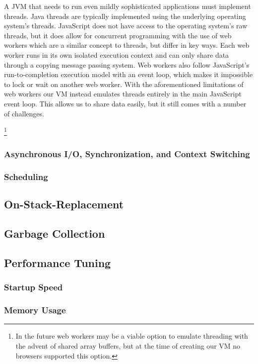 \documentclass{acm_proc_article-sp}
\begin{document}
A JVM that needs to run even mildly sophisticated applications must implement threads.
Java threads are typically implemented using the underlying operating system's threads.
JavaScript does not have access to the operating system's raw threads, but it does allow for concurrent programming with the use of web workers which are a similar concept to threads, but differ in key ways.
Each web worker runs in its own isolated execution context and can only share data through a copying message passing system.
Web workers also follow JavaScript's run-to-completion execution model with an event loop, which makes it impossible to lock or wait on another web worker.
With the aforementioned limitations of web workers our VM instead emulates threads entirely in the main JavaScript event loop.
This allows us to share data easily, but it still comes with a number of challenges.

\footnote{In the future web workers may be a viable option to emulate threading with the advent of shared array buffers, but at the time of creating our VM no browsers supported this option.}

\subsubsection{Asynchronous I/O, Synchronization, and Context Switching}

\subsubsection{Scheduling}

\subsection{On-Stack-Replacement}

\subsection{Garbage Collection}

\subsection{Performance Tuning}

\subsubsection{Startup Speed}

\subsubsection{Memory Usage}
\end{document}
